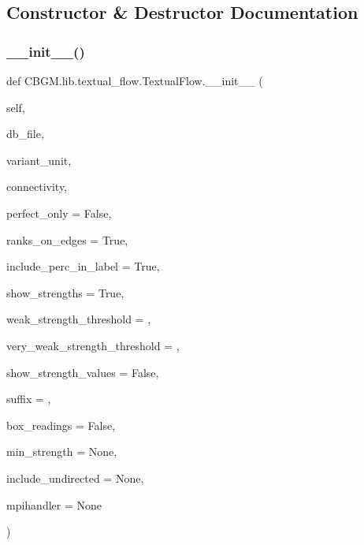 \subsection{Constructor \& Destructor Documentation}
\mbox{\label{classCBGM_1_1lib_1_1textual__flow_1_1TextualFlow_ad70dfb8ec0a3602f6c9a5f962e8934e1}} 
\subsubsection{\texorpdfstring{\+\_\+\+\_\+init\+\_\+\+\_\+()}{\_\_init\_\_()}}
{\footnotesize\ttfamily def C\+B\+G\+M.\+lib.\+textual\+\_\+flow.\+Textual\+Flow.\+\_\+\+\_\+init\+\_\+\+\_\+ (\begin{DoxyParamCaption}\item[{}]{self,  }\item[{}]{db\+\_\+file,  }\item[{}]{variant\+\_\+unit,  }\item[{}]{connectivity,  }\item[{}]{perfect\+\_\+only = {\ttfamily False},  }\item[{}]{ranks\+\_\+on\+\_\+edges = {\ttfamily True},  }\item[{}]{include\+\_\+perc\+\_\+in\+\_\+label = {\ttfamily True},  }\item[{}]{show\+\_\+strengths = {\ttfamily True},  }\item[{}]{weak\+\_\+strength\+\_\+threshold = {},  }\item[{}]{very\+\_\+weak\+\_\+strength\+\_\+threshold = {},  }\item[{}]{show\+\_\+strength\+\_\+values = {\ttfamily False},  }\item[{}]{suffix = {\ttfamily \textquotesingle{}\textquotesingle{}},  }\item[{}]{box\+\_\+readings = {\ttfamily False},  }\item[{}]{min\+\_\+strength = {\ttfamily None},  }\item[{}]{include\+\_\+undirected = {\ttfamily None},  }\item[{}]{mpihandler = {\ttfamily None} }\end{DoxyParamCaption})}

